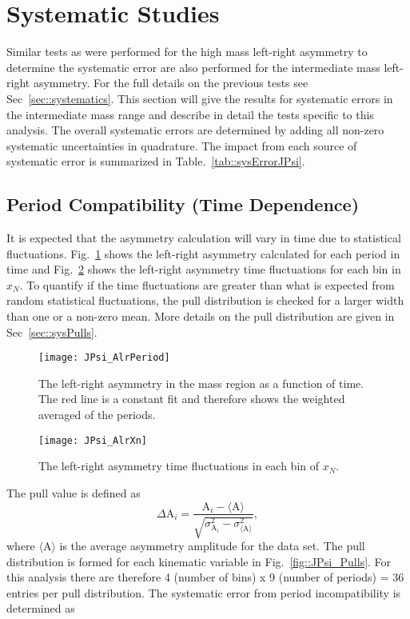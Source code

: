 \section{Systematic Studies}
Similar tests as were performed for the high mass left-right asymmetry to
determine the systematic error are also performed for the intermediate mass
left-right asymmetry.  For the full details on the previous tests see
Sec~\ref{sec::systematics}.  This section will give the results for systematic
errors in the intermediate mass range and describe in detail the tests specific
to this analysis.  The overall systematic errors are determined by adding all
non-zero systematic uncertainties in quadrature.  The impact from each source of
systematic error is summarized in Table.~\ref{tab::sysErrorJPsi}.

\subsection{Period Compatibility (Time Dependence)}
It is expected that the asymmetry calculation will vary in time due to
statistical fluctuations.  Fig.~\ref{fig::JPsi_AlrPeriod} shows the left-right
asymmetry calculated for each period in time and Fig.~\ref{fig::JPsi_AlrXn}
shows the left-right asymmetry time fluctuations for each bin in $x_N$.  To
quantify if the time fluctuations are greater than what is expected from random
statistical fluctuations, the pull distribution is checked for a larger width
than one or a non-zero mean.  More details on the pull distribution are given in
Sec~\ref{sec::sysPulls}.

\begin{figure}[h!t]
  \centering \texttt{[image: JPsi\_AlrPeriod]}
  \caption{The left-right asymmetry in the {\jp} mass region as a function of
    time.  The red line is a constant fit and therefore shows the weighted
    averaged of the periods.}
  \label{fig::JPsi_AlrPeriod}
\end{figure}

\begin{figure}[h!t]
  \centering
  \texttt{[image: JPsi\_AlrXn]}
  \caption{The left-right asymmetry time fluctuations in each bin of $x_N$.}
  \label{fig::JPsi_AlrXn}
\end{figure}

The pull value is defined as
\begin{equation}
  \label{eq::pullJPsi}
  \Delta\mathrm{A}_i =
  \frac{
    \mathrm{A}_i - \langle \mathrm{A} \rangle
  }{
    \sqrt{
      \sigma^2_{\mathrm{A}_i} - \sigma^2_{\langle \mathrm{A} \rangle}
    }
  },
\end{equation}
\noindent
where $\langle \mathrm{A} \rangle$ is the average asymmetry amplitude for the
data set.  The pull distribution is formed for each kinematic variable in
Fig.~\ref{fig::JPsi_Pulls}.  For this analysis there are therefore 4 (number of
bins) x 9 (number of periods) = 36 entries per pull distribution.  The
systematic error from period incompatibility is determined as

